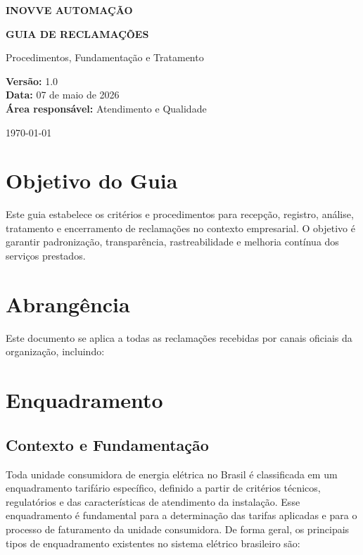 \documentclass[12pt,a4paper]{article}
\begin{document}
\begin{titlepage}
	\centering
	\vspace*{2.5cm}

	{\Large \textbf{INOVVE AUTOMAÇÃO} \par}
	\vspace{1.8cm}

	{\LARGE \textbf{GUIA DE RECLAMAÇÕES} \par}
	\vspace{0.6cm}
	{\large Procedimentos, Fundamentação e Tratamento \par}

	\vfill

	\begin{flushleft}
		\textbf{Versão:} 1.0 \\
		\textbf{Data:} 07 de maio de 2026 \\
		\textbf{Área responsável:} Atendimento e Qualidade
	\end{flushleft}

	\vspace{1.5cm}
	{\large \today \par}
\end{titlepage}

\tableofcontents
\newpage


\section{Objetivo do Guia}
Este guia estabelece os critérios e procedimentos para recepção, registro, análise, tratamento e encerramento de reclamações no contexto empresarial. O objetivo é garantir padronização, transparência, rastreabilidade e melhoria contínua dos serviços prestados.

\section{Abrangência}
Este documento se aplica a todas as reclamações recebidas por canais oficiais da organização, incluindo:

\section{Enquadramento}

\subsection{Contexto e Fundamentação}
Toda unidade consumidora de energia elétrica no Brasil é classificada em um enquadramento tarifário específico, definido a partir de critérios técnicos, regulatórios e das características de atendimento da instalação. Esse enquadramento é fundamental para a determinação das tarifas aplicadas e para o processo de faturamento da unidade consumidora. De forma geral, os principais tipos de enquadramento existentes no sistema elétrico brasileiro são:
\end{document}
